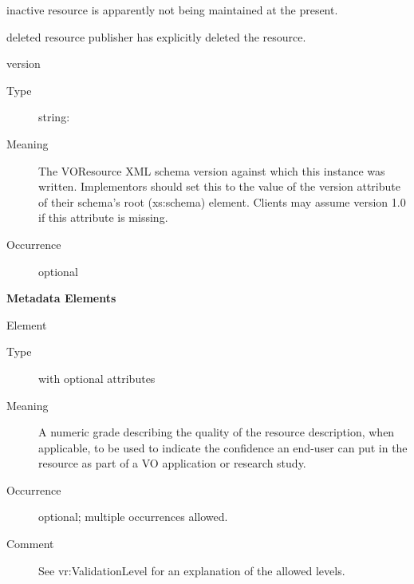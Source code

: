 \documentclass[11pt,a4paper]{ivoa}
\begin{document}
\begin{generated}
\begin{bigdescription}
\begin{description}
\begin{longtermsdescription}
\item[inactive]
                     resource is apparently not being maintained at the present.
                   
\item[deleted]
                      resource publisher has explicitly deleted the resource.
                   
\end{longtermsdescription}
\end{description}
\item[version]
\begin{description}
\item[Type] string: 
\item[Meaning] 
               The VOResource XML schema version 
               against which this instance was written.
               Implementors should set this to the value of the version
               attribute of their schema's root (xs:schema) element.
               Clients may assume version 1.0 if this attribute is 
               missing.
            
\item[Occurrence] optional
\end{description}


\end{bigdescription}\endgroup



\vspace{0.5ex}\noindent\textbf{ Metadata Elements}

\begingroup\small\begin{bigdescription}\item[Element \xmlel{validationLevel}]
\begin{description}
\item[Type]  with optional attributes
\item[Meaning] 
                  A numeric grade describing the quality of the
                  resource description, when applicable, 
                  to be used to indicate the confidence an end-user
                  can put in the resource as part of a VO application
                  or research study. 
               
\item[Occurrence] optional; multiple occurrences allowed.
\item[Comment] 
                  See vr:ValidationLevel for an explanation of the
                  allowed levels.  
               

\end{description}
\end{bigdescription}
\end{generated}
\end{document}
